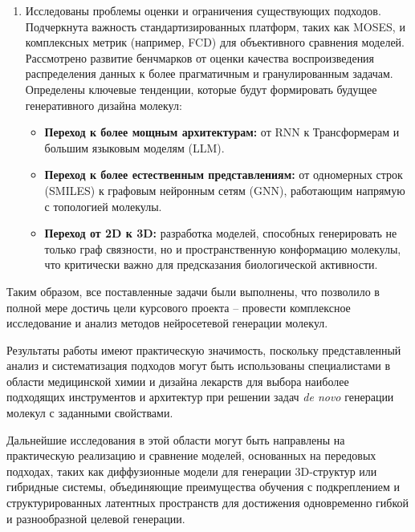 \documentclass[../main.tex]{subfiles}
\begin{document}
\begin{enumerate}
    \item Исследованы проблемы оценки и ограничения существующих подходов. Подчеркнута важность стандартизированных платформ, таких как MOSES, и комплексных метрик (например, FCD) для объективного сравнения моделей. Рассмотрено развитие бенчмарков от оценки качества воспроизведения распределения данных к более прагматичным и гранулированным задачам. Определены ключевые тенденции, которые будут формировать будущее генеративного дизайна молекул:
    \begin{itemize}
        \item \textbf{Переход к более мощным архитектурам:} от RNN к Трансформерам и большим языковым моделям (LLM).
        \item \textbf{Переход к более естественным представлениям:} от одномерных строк (SMILES) к графовым нейронным сетям (GNN), работающим напрямую с топологией молекулы.
        \item \textbf{Переход от 2D к 3D:} разработка моделей, способных генерировать не только граф связности, но и пространственную конформацию молекулы, что критически важно для предсказания биологической активности.
    \end{itemize}
\end{enumerate}

Таким образом, все поставленные задачи были выполнены, что позволило в полной мере достичь цели курсового проекта -- провести комплексное исследование и анализ методов нейросетевой генерации молекул.

Результаты работы имеют практическую значимость, поскольку представленный анализ и систематизация подходов могут быть использованы специалистами в области медицинской химии и дизайна лекарств для выбора наиболее подходящих инструментов и архитектур при решении задач \textit{de novo} генерации молекул с заданными свойствами.

Дальнейшие исследования в этой области могут быть направлены на практическую реализацию и сравнение моделей, основанных на передовых подходах, таких как диффузионные модели для генерации 3D-структур или гибридные системы, объединяющие преимущества обучения с подкреплением и структурированных латентных пространств для достижения одновременно гибкой и разнообразной целевой генерации.
\end{document}

